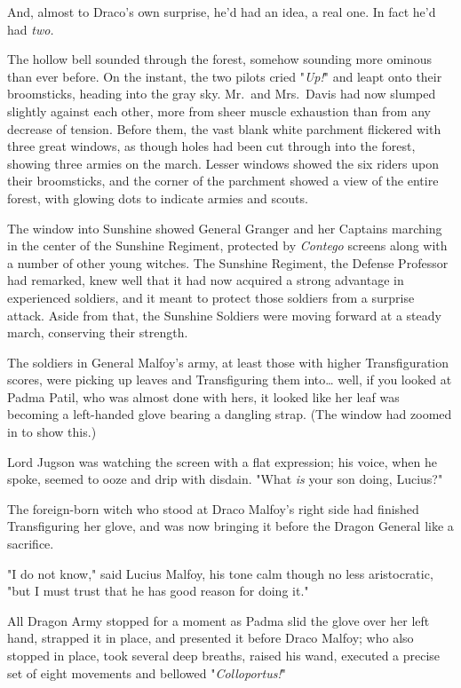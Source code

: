 And, almost to Draco's own surprise, he'd had an idea, a real one. In fact he'd 
had \emph{two.}

The hollow bell sounded through the forest, somehow sounding more ominous than 
ever before. On the instant, the two pilots cried "\emph{Up!}" and leapt onto 
their broomsticks, heading into the gray sky.
\sbreak
Mr.~and Mrs.~Davis had now slumped slightly against each other, more from sheer 
muscle exhaustion than from any decrease of tension. Before them, the vast 
blank white parchment flickered with three great windows, as though holes had 
been cut through into the forest, showing three armies on the march. Lesser 
windows showed the six riders upon their broomsticks, and the corner of the 
parchment showed a view of the entire forest, with glowing dots to indicate 
armies and scouts.

The window into Sunshine showed General Granger and her Captains marching in 
the center of the Sunshine Regiment, protected by \emph{Contego} screens along 
with a number of other young witches. The Sunshine Regiment, the Defense 
Professor had remarked, knew well that it had now acquired a strong advantage 
in experienced soldiers, and it meant to protect those soldiers from a surprise 
attack. Aside from that, the Sunshine Soldiers were moving forward at a steady 
march, conserving their strength.

The soldiers in General Malfoy's army, at least those with higher 
Transfiguration scores, were picking up leaves and Transfiguring them 
into{\ldots} well, if you looked at Padma Patil, who was almost done with hers, 
it looked like her leaf was becoming a left-handed glove bearing a dangling 
strap. (The window had zoomed in to show this.)

Lord Jugson was watching the screen with a flat expression; his voice, when he 
spoke, seemed to ooze and drip with disdain. "What \emph{is} your son doing, 
Lucius?"

The foreign-born witch who stood at Draco Malfoy's right side had finished 
Transfiguring her glove, and was now bringing it before the Dragon General like 
a sacrifice.

"I do not know," said Lucius Malfoy, his tone calm though no less aristocratic, 
"but I must trust that he has good reason for doing it."

All Dragon Army stopped for a moment as Padma slid the glove over her left 
hand, strapped it in place, and presented it before Draco Malfoy; who also 
stopped in place, took several deep breaths, raised his wand, executed a 
precise set of eight movements and bellowed "\emph{Colloportus!}"

